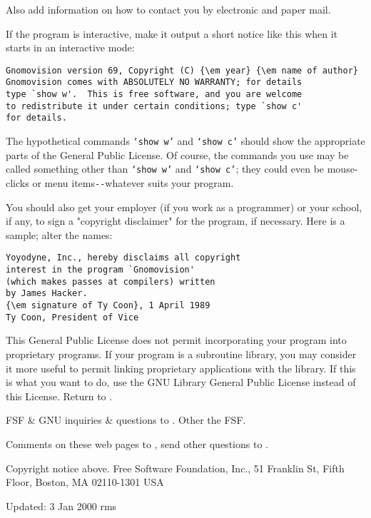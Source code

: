 Also add information on how to contact you by electronic and paper mail. 

If the program is interactive, make it output a short notice like this when it
starts in an interactive mode: 

\footnotesize
\begin{verbatim}
Gnomovision version 69, Copyright (C) {\em year} {\em name of author}
Gnomovision comes with ABSOLUTELY NO WARRANTY; for details
type `show w'.  This is free software, and you are welcome
to redistribute it under certain conditions; type `show c'
for details.
\end{verbatim}
\normalsize

The hypothetical commands {\tt `show w'} and {\tt `show c'} should show the
appropriate parts of the General Public License. Of course, the commands you
use may be called something other than {\tt `show w'} and {\tt `show c'}; they
could even be mouse-clicks or menu items\verb:--:whatever suits your program. 

You should also get your employer (if you work as a programmer) or your
school, if any, to sign a "copyright disclaimer" for the program, if
necessary. Here is a sample; alter the names: 

\footnotesize
\begin{verbatim}
Yoyodyne, Inc., hereby disclaims all copyright
interest in the program `Gnomovision'
(which makes passes at compilers) written
by James Hacker.
{\em signature of Ty Coon}, 1 April 1989
Ty Coon, President of Vice
\end{verbatim}
\normalsize

This General Public License does not permit incorporating your program into
proprietary programs. If your program is a subroutine library, you may
consider it more useful to permit linking proprietary applications with the
library. If this is what you want to do, use the GNU Library General Public
License instead of this License. 
Return to 
. 

FSF \& GNU inquiries \& questions to 
. Other 
 the FSF. 

Comments on these web pages to 
, send other
questions to 
. 

Copyright notice above.
Free Software Foundation, Inc., 51 Franklin St, Fifth Floor,
Boston, MA  02110-1301  USA

Updated: 3 Jan 2000 rms 
